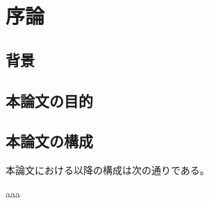 \chapter{序論}
\label{chap:introduction}

\section{背景}
\label{section:background}

\section{本論文の目的}


\section{本論文の構成}

本論文における以降の構成は次の通りである。

aaa